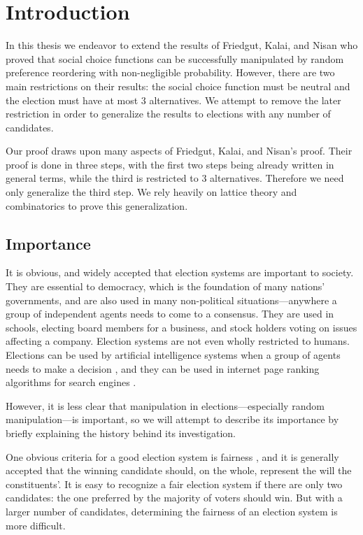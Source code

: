 

\chapter{Introduction}

	In this thesis we endeavor to extend the results of Friedgut, Kalai, and Nisan \cite{friedgut2008elections} who proved that social choice functions can be successfully manipulated by random preference reordering with non-negligible probability. However, there are two main restrictions on their results: the social choice function must be neutral and the election must have at most 3 alternatives. We attempt to remove the later restriction in order to generalize the results to elections with any number of candidates.

	Our proof draws upon many aspects of Friedgut, Kalai, and Nisan's proof. Their proof is done in three steps, with the first two steps being already written in general terms, while the third is restricted to 3 alternatives. Therefore we need only generalize the third step. We rely heavily on lattice theory and combinatorics to prove this generalization.


\section{Importance}

	It is obvious, and widely accepted that election systems are important to society. They are essential to democracy, which is the foundation of many nations' governments, and are also used in many non-political situations---anywhere a group of independent agents needs to come to a consensus. They are used in schools, electing board members for a business, and stock holders voting on issues affecting a company. Election systems are not even wholly restricted to humans. Elections can be used by artificial intelligence systems when a group of agents needs to make a decision \cite{ephrati1991clarke, ephrati1993multi, pennock2000social, dwork2001rank, fagin2003efficient}, and they can be used in internet page ranking algorithms for search engines \cite{chevaleyre2007short}.

	However, it is less clear that manipulation in elections---especially random manipulation---is important, so we will attempt to describe its importance by briefly explaining the history behind its investigation.

	One obvious criteria for a good election system is fairness \cite{chevaleyre2006issues}, and it is generally accepted that the winning candidate should, on the whole, represent the will the constituents'. It is easy to recognize a fair election system if there are only two candidates: the one preferred by the majority of voters should win. But with a larger number of candidates, determining the fairness of an election system is more difficult.


